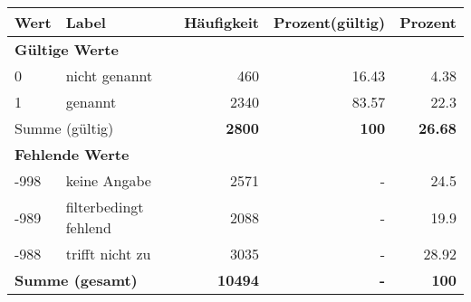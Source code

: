      \begin{longtable}{lXrrr}
     \toprule
     \textbf{Wert} & \textbf{Label} & \textbf{Häufigkeit} & \textbf{Prozent(gültig)} & \textbf{Prozent} \\
     \endhead
     \midrule
     \multicolumn{5}{l}{\textbf{Gültige Werte}}\\

     0 &
     \multicolumn{1}{X}{ nicht genannt   } &


       \num{460} &
       \num[round-mode=places,round-precision=2]{16.43} &
         \num[round-mode=places,round-precision=2]{4.38} \\

     1 &
     \multicolumn{1}{X}{ genannt   } &


       \num{2340} &
       \num[round-mode=places,round-precision=2]{83.57} &
         \num[round-mode=places,round-precision=2]{22.3} \\
     \midrule
     \multicolumn{2}{l}{Summe (gültig)} &
       \textbf{\num{2800}} &
     \textbf{\num{100}} &
       \textbf{\num[round-mode=places,round-precision=2]{26.68}} \\
     \multicolumn{5}{l}{\textbf{Fehlende Werte}}\\
       -998 &
       keine Angabe &
         \num{2571} &
        - &
         \num[round-mode=places,round-precision=2]{24.5} \\
       -989 &
       filterbedingt fehlend &
         \num{2088} &
        - &
         \num[round-mode=places,round-precision=2]{19.9} \\
       -988 &
       trifft nicht zu &
         \num{3035} &
        - &
         \num[round-mode=places,round-precision=2]{28.92} \\
     \midrule
     \multicolumn{2}{l}{\textbf{Summe (gesamt)}} &
          \textbf{\num{10494}} &
        \textbf{-} &
        \textbf{\num{100}} \\
     \bottomrule
     \end{longtable}
     
